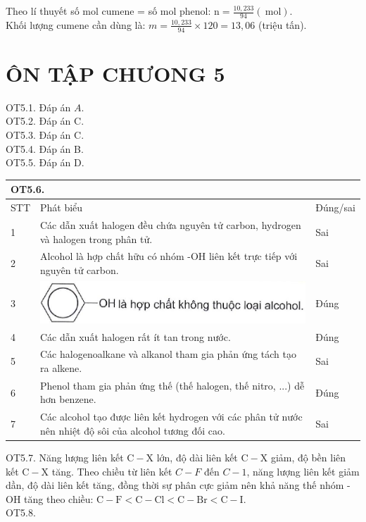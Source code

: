 \documentclass[10pt]{article}
\begin{document}
Theo lí thuyết số mol cumene = số mol phenol: $\mathrm{n}=\frac{10,233}{94}(\mathrm{~mol})$.\\
Khối lượng cumene cần dùng là: $m=\frac{10,233}{94} \times 120=13,06$ (triệu tấn).

\section*{ÔN TẬP CHƯONG 5}
OT5.1. Đáp án $A$.\\
OT5.2. Đáp án C.\\
OT5.3. Đáp án C.\\
OT5.4. Đáp án B.\\
OT5.5. Đáp án D.

\begin{center}
\begin{tabular}{|l|l|l|}
\hline
\multicolumn{3}{|l|}{OT5.6.} \\
\hline
STT & Phát biểu & Đúng/sai \\
\hline
1 & Các dẫn xuất halogen đều chứa nguyên tử carbon, hydrogen và halogen trong phân tử. & Sai \\
\hline
2 & Alcohol là hợp chất hữu có nhóm -OH liên kết trực tiếp với nguyên tử carbon. & Sai \\
\hline
3 & \includegraphics[max width=\textwidth]{2025_10_23_adad5b98d65ac6665838g-36}
 & Đúng \\
\hline
4 & Các dẫn xuất halogen rất ít tan trong nước. & Đúng \\
\hline
5 & Các halogenoalkane và alkanol tham gia phản ứng tách tạo ra alkene. & Sai \\
\hline
6 & Phenol tham gia phản ứng thế (thế halogen, thế nitro, ...) dễ hơn benzene. & Đúng \\
\hline
7 & Các alcohol tạo được liên kết hydrogen với các phân tử nước nên nhiệt độ sôi của alcohol tương đối cao. & Sai \\
\hline
\end{tabular}
\end{center}

OT5.7. Năng lượng liên kết $\mathrm{C}-\mathrm{X}$ lớn, độ dài liên kết $\mathrm{C}-\mathrm{X}$ giảm, độ bền liên kết $\mathrm{C}-\mathrm{X}$ tăng. Theo chiều từ liên kết $C-F$ đến $C-1$, năng lượng liên kết giảm dần, độ dài liên kết tăng, đồng thời sự phân cực giảm nên khả năng thế nhóm -OH tăng theo chiều: $\mathrm{C}-\mathrm{F}<\mathrm{C}-\mathrm{Cl}<\mathrm{C}-\mathrm{Br}<\mathrm{C}-\mathrm{I}$.\\
OT5.8.
\end{document}
